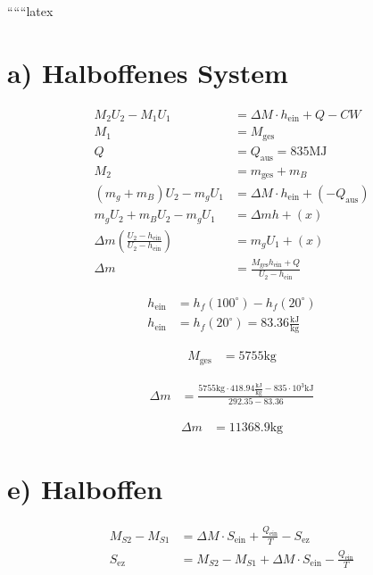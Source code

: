 ``````latex


\section*{a) Halboffenes System}

\begin{align*}
    M_2 U_2 - M_1 U_1 &= \Delta M \cdot h_{\text{ein}} + Q - CW \\
    M_1 &= M_{\text{ges}} \\
    Q &= Q_{\text{aus}} = 835 \text{MJ} \\
    M_2 &= m_{\text{ges}} + m_B \\
    (m_g + m_B) U_2 - m_g U_1 &= \Delta M \cdot h_{\text{ein}} + (-Q_{\text{aus}}) \\
    m_g U_2 + m_B U_2 - m_g U_1 &= \Delta m h + (x) \\
    \Delta m \left( \frac{U_2 - h_{\text{ein}}}{U_2 - h_{\text{ein}}} \right) &= m_g U_1 + (x) \\
    \Delta m &= \frac{M_{\text{ges}} h_{\text{ein}} + Q}{U_2 - h_{\text{ein}}}
\end{align*}

\begin{align*}
    h_{\text{ein}} &= h_f(100^\circ) - h_f(20^\circ) \\
    h_{\text{ein}} &= h_f(20^\circ) = 83.36 \frac{\text{kJ}}{\text{kg}}
\end{align*}

\begin{align*}
    M_{\text{ges}} &= 5755 \text{kg}
\end{align*}

\begin{align*}
    \Delta m &= \frac{5755 \text{kg} \cdot 418.94 \frac{\text{kJ}}{\text{kg}} - 835 \cdot 10^3 \text{kJ}}{292.35 - 83.36}
\end{align*}

\begin{align*}
    \Delta m &= 11368.9 \text{kg}
\end{align*}

\section*{e) Halboffen}

\begin{align*}
    M_{S2} - M_{S1} &= \Delta M \cdot S_{\text{ein}} + \frac{Q_{\text{ein}}}{T} - S_{\text{ez}} \\
    S_{\text{ez}} &= M_{S2} - M_{S1} + \Delta M \cdot S_{\text{ein}} - \frac{Q_{\text{ein}}}{T}
\end{align*}

